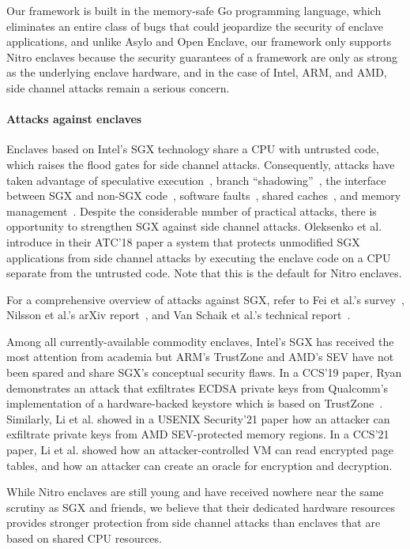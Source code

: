 Our framework is built in the memory-safe Go programming language, which
eliminates an entire class of bugs that could jeopardize the security of
enclave applications, and unlike Asylo and Open Enclave, our framework only
supports Nitro enclaves because the security guarantees of a framework are only
as strong as the underlying enclave hardware, and in the case of Intel, ARM,
and AMD, side channel attacks remain a serious concern.

\paragraph{Attacks against enclaves}

Enclaves based on Intel's SGX technology share a CPU with untrusted code, which
raises the flood gates for side channel attacks.  Consequently, attacks have
taken advantage of
speculative execution~\cite{VanBulck2018a,VanSchaik2021a},
branch ``shadowing''~\cite{Lee2017b},
the interface between SGX and non-SGX code~\cite{Bulck19a},
software faults~\cite{Murdock2020a},
shared caches~\cite{Brasser2017a},
and memory management~\cite{Wang2017a}.
Despite the considerable number of practical attacks, there is opportunity to
strengthen SGX against side channel attacks.  Oleksenko et al. introduce in
their ATC'18 paper a system that protects unmodified SGX applications from side
channel attacks by executing the enclave code on a CPU separate from the
untrusted code.  Note that this is the default for Nitro enclaves.

For a comprehensive overview of attacks against SGX, refer to Fei et al.'s
survey~\cite{Fei2021a}, Nilsson et al.'s arXiv report~\cite{Nilsson20a}, and
Van Schaik et al.'s technical report~\cite{Schaik2022a}.

Among all currently-available commodity enclaves, Intel's SGX has received the
most attention from academia but ARM's TrustZone and AMD's SEV have not been
spared and share SGX's conceptual security flaws.  In a CCS'19 paper, Ryan
demonstrates an attack that exfiltrates ECDSA private keys from Qualcomm's
implementation of a hardware-backed keystore which is based on
TrustZone~\cite{Ryan2019a}.  Similarly, Li et al. showed in a USENIX
Security'21 paper how an attacker can exfiltrate private keys from AMD
SEV-protected memory regions.  In a CCS'21 paper, Li et al. showed how an
attacker-controlled VM can read encrypted page tables, and how an attacker can
create an oracle for encryption and decryption.

While Nitro enclaves are still young and have received nowhere near the same
scrutiny as SGX and friends, we believe that their dedicated hardware resources
provides stronger protection from side channel attacks than enclaves
that are based on shared CPU resources.
